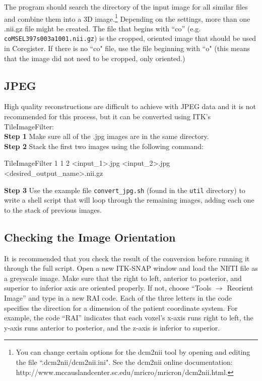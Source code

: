 \documentclass[12pt]{article}
\begin{document}
The program should search the directory of the input image for all similar files and combine them into a 3D image.\footnote{You can change certain options for the dcm2nii tool by opening and editing the file ``.dcm2nii/dcm2nii.ini".  See the dcm2nii online documentation: http://www.mccauslandcenter.sc.edu/mricro/mricron/dcm2nii.html.} Depending on the settings, more than one .nii.gz file might be created. The file that begins with ``co'' (e.g. \texttt{coMSEL397s003a1001.nii.gz}) is the cropped, oriented image that should be used in Coregister. If there is no ``co" file, use the file beginning with ``o" (this means that the image did not need to be cropped, only oriented.)

\subsection*{JPEG}
High quality reconstructions are difficult to achieve with JPEG data and it is not recommended for this process, but it can be converted using ITK's TileImageFilter:\\
\textbf{Step 1} Make sure all of the .jpg images are in the same directory. \\
\textbf{Step 2} Stack the first two images using the following command:\\
\begin{verb}
  TileImageFilter 1 1 2 <input_1>.jpg  <input_2>.jpg <desired_output_name>.nii.gz 
\end{verb}
\textbf{Step 3} Use the example file \texttt{convert\_jpg.sh} (found in the \texttt{util} directory) to write a shell script that will loop through the remaining images, adding each one to the stack of previous images. 

\subsection*{Checking the Image Orientation}
It is recommended that you check the result of the conversion before running it through the full script.  Open a new ITK-SNAP window and load the NIfTI file as a greyscale image. Make sure that the right to left, anterior to posterior, and superior to inferior axis are oriented properly. If not, choose ``Tools $\rightarrow$ Reorient Image'' and type in a new RAI code. Each of the three letters in the code specifies the direction for a dimension of the patient coordinate system. For example, the code ``RAI'' indicates that each voxel's x-axis runs right to left, the y-axis runs anterior to posterior, and the z-axis is inferior to superior. 
\end{document}
